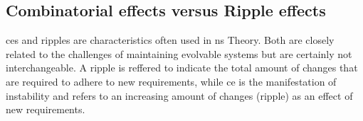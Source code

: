 \subsection{Combinatorial effects versus Ripple effects} \label{subsec_ripple_effect}

\glspl{ce} and \glspl{ripple} are characteristics often used in \gls{ns} Theory. Both are
closely related to the challenges of maintaining evolvable systems but are certainly not
interchangeable. A \gls{ripple} is reffered to indicate the total amount of changes that
are required to adhere to new requirements, while \gls{ce} is the manifestation of
instability and refers to an increasing amount of changes (ripple) as an effect of new
requirements.